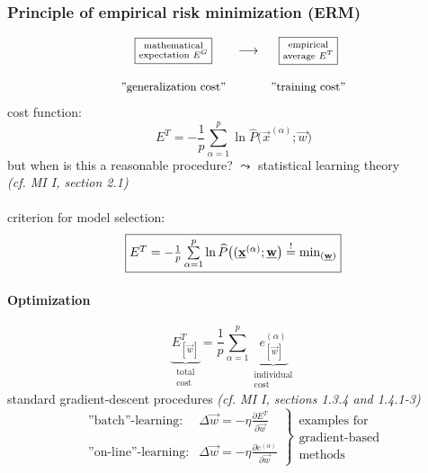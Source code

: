 \subsubsection{Principle of empirical risk minimization (ERM)}
\label{sec:ERMDE}
\[ \begin{array}{ccc}
	\fbox{$ \substack{ \text{mathematical} \\ \text{expectation } E^G} $}
	& \longrightarrow & \fbox{$ \substack{ \text{empirical} \\ 
		\text{average } E^T} $}
	\\\\
	\text{{\small ''generalization cost''}} && 
	\text{{\small ''training cost''}}
\end{array} \]
cost function:
\begin{equation}
	E^T = -\frac{1}{p} \sum\limits_{\alpha = 1}^p \ln 
		\widehat{P}\big( \vec{x}^{(\alpha)};\vec{w} \big) 
\end{equation}
but when is this a reasonable procedure? $\leadsto$ statistical learning theory
\\
{\it (cf. MI I, section 2.1)}
\\\\
criterion for model selection:
\begin{equation}
	\fbox{$ E^T = -\frac{1}{p} \sum\limits_{\alpha = 1}^p \ln 
		\widehat{P}\big( (\underline{\mathbf{x}}^{(\alpha)};\underline{\mathbf{w}} \big)
		\stackrel{\mathrm{!}}{=} \min_{(\underline{\mathbf{w}})} $}
\end{equation}

\paragraph{Optimization}
\begin{equation}
	\underbrace{ E_{[\vec{w}]}^T }_{ \substack{\text{total} \\ \text{cost}}}
		= \frac{1}{p} \sum\limits_{\alpha = 1}^p 
		\underbrace{ e_{[\vec{w}]}^{(\alpha)} }_{
			\substack{ \text{individual} \\ \text{cost} }}
\end{equation}
standard gradient-descent procedures {\it (cf. MI I, sections 1.3.4 and 1.4.1-3)}
\begin{equation}
	\left.  \begin{array}{ll}
	\text{''batch''-learning:} 
		& \Delta \vec{w} = -\eta \frac{\partial E^T}{\partial \vec{w}}
		\\\\
	\text{''on-line''-learning:}
		& \Delta \vec{w} = -\eta \frac{\partial e^{(\alpha)}}{\partial
			\vec{w}}
	\end{array} \right \} 
	\substack{ \text{examples for} \\ 
			\text{gradient-based} \\
			\text{methods}}
\end{equation}

